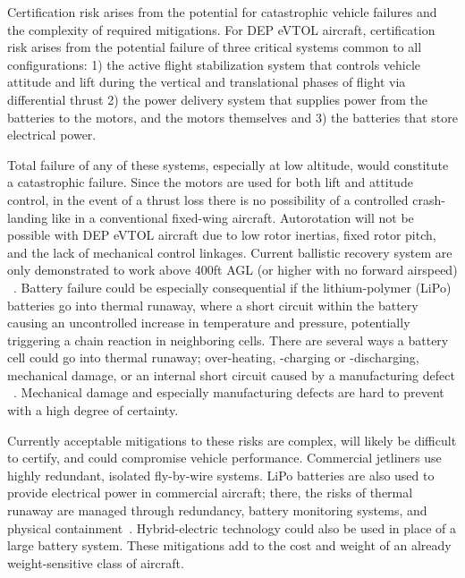 \documentclass[]{aiaa-tc}%
\begin{document}

Certification risk arises from the potential for catastrophic vehicle failures and the complexity of required mitigations.  For DEP eVTOL aircraft, certification risk arises from the potential failure of three critical systems common to all configurations:  1) the active flight stabilization system that controls vehicle attitude and lift during the vertical and translational phases of flight via differential thrust 2) the power delivery system that supplies power from the batteries to the motors, and the motors themselves and 3) the batteries that store electrical power. 

Total failure of any of these systems, especially at low altitude, would constitute a catastrophic failure.  Since the motors are used for both lift and attitude control, in the event of a thrust loss there is no possibility of a controlled crash-landing like in a conventional fixed-wing aircraft. Autorotation will not be possible with DEP eVTOL aircraft due to low rotor inertias, fixed rotor pitch, and the lack of mechanical control linkages. Current ballistic recovery system are only demonstrated to work above 400ft AGL (or higher with no forward airspeed) ~\cite{CAPS}.  Battery failure could be especially consequential if the lithium-polymer (LiPo) batteries go into thermal runaway, where a short circuit within the battery causing an uncontrolled increase in temperature and pressure, potentially triggering a chain reaction in neighboring cells.  There are several ways a battery cell could go into thermal runaway; over-heating, -charging or -discharging, mechanical damage, or an internal short circuit caused by a manufacturing defect ~\cite{Doughty2012}.  Mechanical damage and especially manufacturing defects are hard to prevent with a high degree of certainty.

Currently acceptable mitigations to these risks are complex, will likely be difficult to certify, and could compromise vehicle performance. Commercial jetliners use highly redundant, isolated fly-by-wire systems.  LiPo batteries are also used to provide electrical power in commercial aircraft; there, the risks of thermal runaway are managed through redundancy, battery monitoring systems, and physical containment~\cite{NYT_bat}. Hybrid-electric technology could also be used in place of a large battery system.  These mitigations add to the cost and weight of an already weight-sensitive class of aircraft.  
\end{document}

